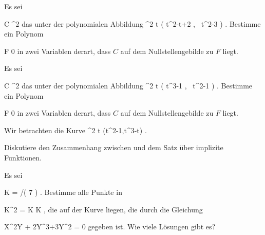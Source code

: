 {}
{
Es sei

\mavergleichskette
{\vergleichskette
{ C
}
{ \subseteq }{ \R^2
}
{  }{
}
{    }{
}
{   }{
}
}
{}{}{}
das
unter der polynomialen Abbildung
\maabbeledisp {} { \R } { \R^2
} { t } { \left( t^2-t+2  , \,  t^2-3                   \right)
} {.}
Bestimme ein Polynom

\mavergleichskette
{\vergleichskette
{ F
}
{ \neq }{ 0
}
{  }{
}
{    }{
}
{   }{
}
}
{}{}{}
in zwei Variablen derart, dass $C$ auf dem Nullstellengebilde zu $F$ liegt.

}
{} {}


{}
{
Es sei

\mavergleichskette
{\vergleichskette
{ C
}
{ \subseteq }{ \R^2
}
{  }{
}
{    }{
}
{   }{
}
}
{}{}{}
das
unter der polynomialen Abbildung
\maabbeledisp {} { \R } { \R^2
} { t } { \left( t^3-1  , \,  t^2-1                   \right)
} {.}
Bestimme ein Polynom

\mavergleichskette
{\vergleichskette
{ F
}
{ \neq }{ 0
}
{  }{
}
{    }{
}
{   }{
}
}
{}{}{}
in zwei Variablen derart, dass $C$ auf dem Nullstellengebilde zu $F$ liegt.

}
{} {}


{}
{
Wir betrachten die Kurve
\maabbeledisp {} {\R} {\R^2
} { t } {(t^2-1,t^3-t)
} {.}

}
{} {}


{}
{
Diskutiere den Zusammenhang zwischen
und
dem Satz über implizite Funktionen.

}
{} {}


{}
{
Es sei

\mavergleichskette
{\vergleichskette
{ K
}
{ = }{ \Z/( 7 )
}
{  }{
}
{    }{
}
{   }{
}
}
{}{}{.}
Bestimme alle Punkte in

\mavergleichskette
{\vergleichskette
{ K^2
}
{ = }{ K \times K
}
{  }{
}
{    }{
}
{   }{
}
}
{}{}{,}
die auf der Kurve liegen, die durch die Gleichung

\mavergleichskettedisp
{\vergleichskette
{ X^2Y  + 2Y^3+3Y^2
}
{ =} { 0
}
{ } {
}
{ } {
}
{ } {
}
}
{}{}{}
gegeben ist. Wie viele Lösungen gibt es?

}
{} {}


